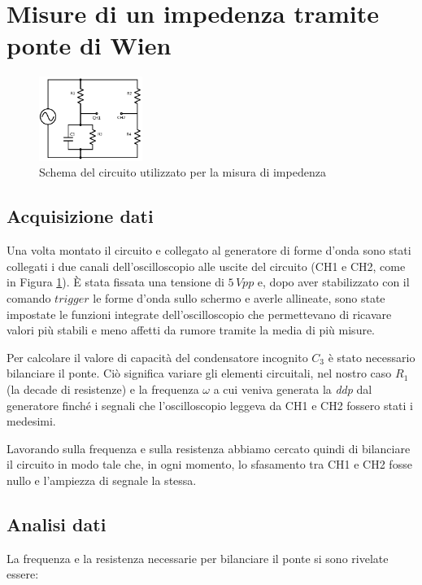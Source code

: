 \section{Misure di un impedenza tramite ponte di Wien}

\begin{figure}
	\centering
    \includegraphics[width=0.30\textwidth]{schema1.pdf}
    \caption{Schema del circuito utilizzato per la misura di impedenza}
    \label{fig:circuito1}
\end{figure}

\subsection{Acquisizione dati}
Una volta montato il circuito e collegato al generatore di forme d'onda sono stati collegati i due canali dell'oscilloscopio alle uscite del circuito (CH1 e CH2, come in Figura \ref{fig:circuito1}). 
\`E stata fissata una tensione di $5\,Vpp$ e, dopo aver stabilizzato con il comando $trigger$ le forme d'onda sullo schermo e averle allineate, sono state impostate le funzioni integrate dell'oscilloscopio che permettevano di ricavare valori più stabili e meno affetti da rumore tramite la media di più misure.

Per calcolare il valore di capacità del condensatore incognito $C_3$ è stato necessario bilanciare il ponte. Ciò significa variare gli elementi circuitali, nel nostro caso $R_1$ (la decade di resistenze) e la frequenza $\omega$ a cui veniva generata la \emph{ddp} dal generatore finché i segnali che l'oscilloscopio leggeva da CH1 e CH2 fossero stati i medesimi.

Lavorando sulla frequenza e sulla resistenza abbiamo cercato quindi di bilanciare il circuito in modo tale che, in ogni momento, lo sfasamento tra CH1 e CH2 fosse nullo e l'ampiezza di segnale la stessa.

\subsection{Analisi dati}

La frequenza e la resistenza necessarie per bilanciare il ponte si sono rivelate essere:

